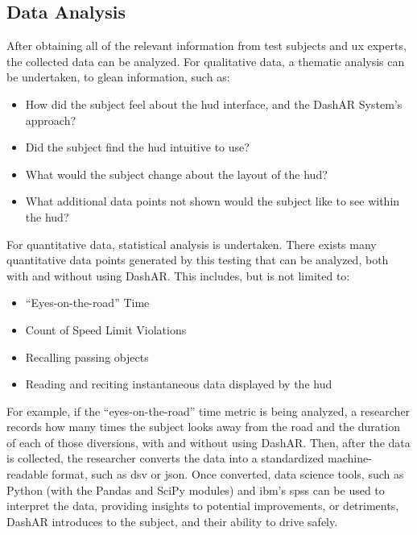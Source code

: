     \subsection{Data Analysis}
        \par After obtaining all of the relevant information from test subjects and \gls{ux} experts, the collected data can be analyzed. For qualitative data, a thematic analysis can be undertaken, to glean information, such as:

        \begin{itemize}
            \item How did the subject feel about the \gls{hud} interface, and the DashAR System's approach?
            \item Did the subject find the \gls{hud} intuitive to use?
            \item What would the subject change about the layout of the \gls{hud}?
            \item What additional data points not shown would the subject like to see within the \gls{hud}?
        \end{itemize}

        \par For quantitative data, statistical analysis is undertaken. There exists many quantitative data points generated by this testing that can be analyzed, both with and without using DashAR. This includes, but is not limited to:

        \begin{itemize}
            \item ``Eyes-on-the-road'' Time
            \item Count of Speed Limit Violations
            \item Recalling passing objects
            \item Reading and reciting instantaneous data displayed by the \gls{hud}
        \end{itemize}

        \par For example, if the ``eyes-on-the-road'' time metric is being analyzed, a researcher records how many times the subject looks away from the road and the duration of each of those diversions, with and without using DashAR. Then, after the data is collected, the researcher converts the data into a standardized machine-readable format, such as \gls{dsv} or \gls{json}. Once converted, data science tools, such as Python (with the Pandas and SciPy modules) and \gls{ibm}'s \gls{spss} can be used to interpret the data, providing insights to potential improvements, or detriments, DashAR introduces to the subject, and their ability to drive safely.

